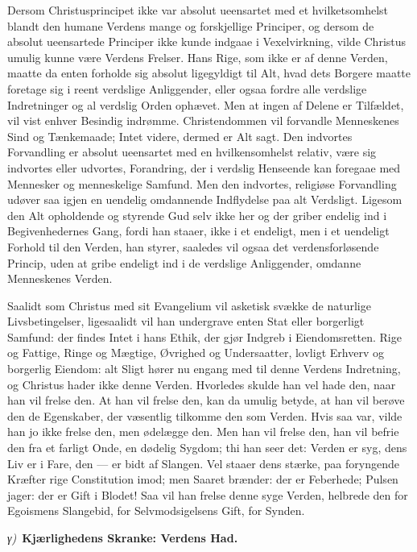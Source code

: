 \documentclass[12pt]{book}
\newcommand{\greekrun}[2]{%
  \medskip\begin{center}{\itshape #1)}\ {\bfseries #2}\end{center}\medskip}
\begin{document}
Dersom Christusprincipet ikke var absolut ueensartet med et
hvilketsomhelst blandt den humane Verdens mange og forskjellige
Principer, og dersom de absolut ueensartede Principer ikke kunde
indgaae i Vexelvirkning, vilde Christus umulig kunne være Verdens
Frelser. Hans Rige, som ikke er af denne Verden, maatte da enten
forholde sig absolut ligegyldigt til Alt, hvad dets Borgere maatte
foretage sig i reent verdslige Anliggender, eller ogsaa fordre alle
verdslige Indretninger og al verdslig Orden ophævet. Men at ingen af
Delene er Tilfældet, vil vist enhver Besindig indrømme.
Christendommen vil forvandle Menneskenes Sind og Tænkemaade; Intet
videre, dermed er Alt sagt. Den indvortes Forvandling er absolut
ueensartet med en hvilkensomhelst relativ, være sig indvortes eller
udvortes, Forandring, der i verdslig Henseende kan foregaae med
Mennesker og menneskelige Samfund. Men den indvortes, religiøse
Forvandling udøver saa igjen en uendelig omdannende Indflydelse paa
alt Verdsligt. Ligesom den Alt opholdende og styrende Gud selv ikke
her og der griber endelig ind i Begivenhedernes Gang, fordi han
staaer, ikke i et endeligt, men i et uendeligt Forhold til den
Verden, han styrer, saaledes vil ogsaa det verdensforløsende Princip,
uden at gribe endeligt ind i de verdslige Anliggender, omdanne
Menneskenes Verden.

Saalidt som Christus med sit Evangelium vil asketisk svække de
naturlige Livsbetingelser, ligesaalidt vil han undergrave enten Stat
eller borgerligt Samfund: der findes Intet i hans Ethik, der gjør
Indgreb i Eiendomsretten.
Rige og Fattige, Ringe og Mægtige, Øvrighed og Undersaatter, lovligt
Erhverv og borgerlig Eiendom: alt Sligt hører nu engang med til
denne Verdens Indretning, og Christus hader ikke denne Verden.
Hvorledes skulde han vel hade den, naar han vil frelse den. At han
vil frelse den, kan da umulig betyde, at han vil berøve den de
Egenskaber, der væsentlig tilkomme den som Verden. Hvis saa var,
vilde han jo ikke frelse den, men ødelægge den. Men han vil frelse
den, han vil befrie den fra et farligt Onde, en dødelig Sygdom; thi
han seer det: Verden er syg, dens Liv er i Fare, den --- er bidt af
Slangen. Vel staaer dens stærke, paa foryngende Kræfter rige
Constitution imod; men Saaret brænder: der er Feberhede; Pulsen
jager: der er Gift i Blodet! Saa vil han frelse denne syge Verden,
helbrede den for Egoismens Slangebid, for Selvmodsigelsens Gift, for
Synden.

\greekrun{γ}{Kjærlighedens Skranke: Verdens Had.}
\end{document}
